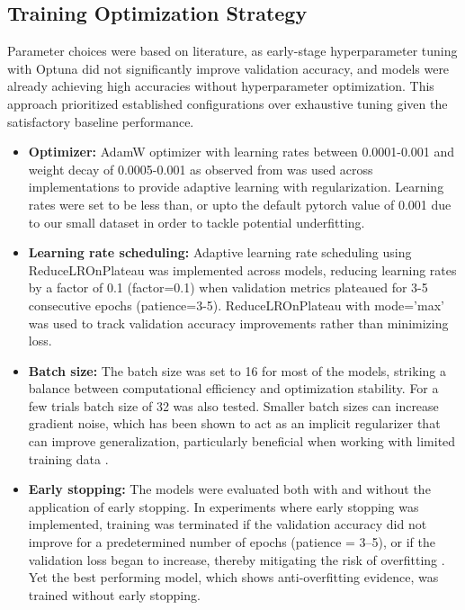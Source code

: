 \documentclass[a4paper,12pt]{report}
\begin{document}

\subsection{Training Optimization Strategy}
Parameter choices were based on literature, as early-stage hyperparameter tuning with Optuna did not significantly improve validation accuracy, and models were already achieving high accuracies without hyperparameter optimization. This approach prioritized established configurations over exhaustive tuning given the satisfactory baseline performance.

\begin{itemize}
    \item \textbf{Optimizer:} AdamW optimizer with learning rates between 0.0001-0.001 and weight decay of 0.0005-0.001 as observed from  was used across implementations to provide adaptive learning with regularization. Learning rates were set to be less than, or upto the default pytorch value of 0.001 due to our small dataset in order to tackle potential underfitting.
    
    \item \textbf{Learning rate scheduling:} Adaptive learning rate scheduling using ReduceLROnPlateau was implemented across models, reducing learning rates by a factor of 0.1 (factor=0.1) when validation metrics plateaued for 3-5 consecutive epochs (patience=3-5). ReduceLROnPlateau with mode='max' was used to track validation accuracy improvements rather than minimizing loss.
    
    \item \textbf{Batch size:} The batch size was set to 16 for most of the models, striking a balance between computational efficiency and optimization stability. For a few trials batch size of 32 was also tested. Smaller batch sizes can increase gradient noise, which has been shown to act as an implicit regularizer that can improve generalization, particularly beneficial when working with limited training data \citep{keskar2016largebatch, masters2018revisiting}.
    
    \item \textbf{Early stopping:} The models were evaluated both with and without the application of early stopping. In experiments where early stopping was implemented, training was terminated if the validation accuracy did not improve for a predetermined number of epochs (patience = 3–5), or if the validation loss began to increase, thereby mitigating the risk of overfitting \citep{Prechelt1998}. Yet the best performing model, which shows anti-overfitting evidence, was trained without early stopping.


\end{itemize}
\end{document}
